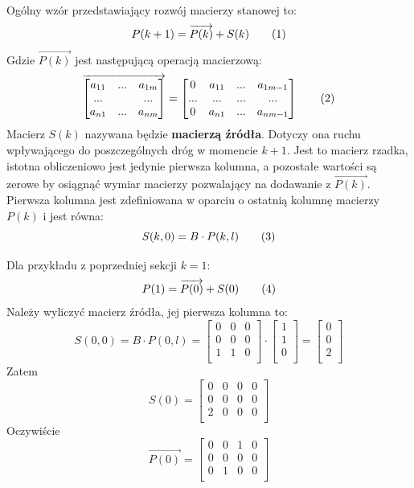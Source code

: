 \documentclass[12pt]{book}
\newcommand\addtag{\refstepcounter{equation}
\tag{\theequation}}
\begin{document}
\begin{tcolorbox}

Ogólny wzór przedstawiający rozwój macierzy stanowej to:
\[P(k+1)=\overrightarrow{P(k)} + S(k) \addtag \label{eq:P}\]
Gdzie $\overrightarrow{P(k)}$ jest następującą operacją macierzową:
\begin{gather}
\overrightarrow{
  \begin{bmatrix}
   a_{11} & ... & a_{1m}\\
   ... & & ...\\
   a_{n1} & ... & a_{nm}\\
   \end{bmatrix}}
 =
  \begin{bmatrix}
   0 & a_{11} & ... & a_{1m-1}\\
   ... & ... & ... & ...\\
   0 & a_{n1} & ... & a_{nm-1}\\
   \end{bmatrix}
   \addtag
   \label{arrow_function}
\end{gather}
Macierz $S(k)$ nazywana będzie \textbf{macierzą źródła}. Dotyczy ona ruchu wpływającego do poszczególnych dróg w momencie $k+1$. Jest to macierz rzadka, istotna obliczeniowo jest jedynie pierwsza kolumna, a pozostałe wartości są zerowe by osiągnąć wymiar macierzy pozwalający na dodawanie z $\overrightarrow{P(k)}$. Pierwsza kolumna jest zdefiniowana w oparciu o ostatnią kolumnę macierzy $P(k)$ i jest równa:
\[S(k,0)=B\cdot P(k,l) \addtag \label{eq:S} \]
\end{tcolorbox}

Dla przykładu z poprzedniej sekcji $k=1$:
\[P(1)=\overrightarrow{P(0)}+S(0) \addtag \label{eq:P_1} \]
Należy wyliczyć macierz źródła, jej pierwsza kolumna to:
\[S(0,0)=B\cdot P(0,l)=
  \begin{bmatrix}
   0 & 0 & 0\\
   0 & 0 & 0\\
   1 & 1 & 0\\
   \end{bmatrix}
   \cdot
   \begin{bmatrix}
   1\\
   1\\
   0\\
   \end{bmatrix}
   =
      \begin{bmatrix}
   0\\
   0\\
   2\\
   \end{bmatrix}
 \]
 Zatem 
 \[S(0)=\begin{bmatrix}
 0 & 0 & 0 & 0\\
 0 & 0 & 0 & 0\\
 2 & 0 & 0 & 0\\
 \end{bmatrix}\]
 Oczywiście
 \[ \overrightarrow{P(0)}=
\begin{bmatrix}
 0 & 0 & 1 & 0\\
 0 & 0 & 0 & 0\\
 0 & 1 & 0 & 0\\
 \end{bmatrix} 
 \]
  
\end{document}
